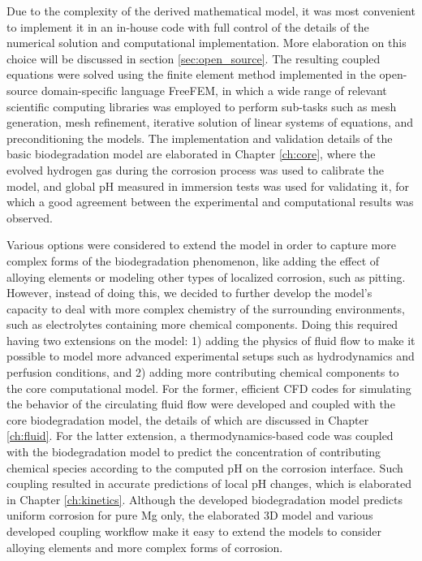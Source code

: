 Due to the complexity of the derived mathematical model, it was most convenient to implement it in an in-house code with full control of the details of the numerical solution and computational implementation. More elaboration on this choice will be discussed in section \ref{sec:open_source}. The resulting coupled equations were solved using the finite element method implemented in the open-source domain-specific language FreeFEM, in which a wide range of relevant scientific computing libraries was employed to perform sub-tasks such as mesh generation, mesh refinement, iterative solution of linear systems of equations, and preconditioning the models. The implementation and validation details of the basic biodegradation model are elaborated in Chapter \ref{ch:core}, where the evolved hydrogen gas during the corrosion process was used to calibrate the model, and global pH measured in immersion tests was used for validating it, for which a good agreement between the experimental and computational results was observed.

Various options were considered to extend the model in order to capture more complex forms of the biodegradation phenomenon, like adding the effect of alloying elements or modeling other types of localized corrosion, such as pitting. However, instead of doing this, we decided to further develop the model’s capacity to deal with more complex chemistry of the surrounding environments, such as electrolytes containing more chemical components. Doing this required having two extensions on the model: 1) adding the physics of fluid flow to make it possible to model more advanced experimental setups such as hydrodynamics and perfusion conditions, and 2) adding more contributing chemical components to the core computational model. For the former, efficient \gls{CFD} codes for simulating the behavior of the circulating fluid flow were developed and coupled with the core biodegradation model, the details of which are discussed in Chapter \ref{ch:fluid}. For the latter extension, a thermodynamics-based code was coupled with the biodegradation model to predict the concentration of contributing chemical species according to the computed pH on the corrosion interface. Such coupling resulted in accurate predictions of local pH changes, which is elaborated in Chapter \ref{ch:kinetics}. Although the developed biodegradation model predicts uniform corrosion for pure Mg only, the elaborated 3D model and various developed coupling workflow make it easy to extend the models to consider alloying elements and more complex forms of corrosion.

